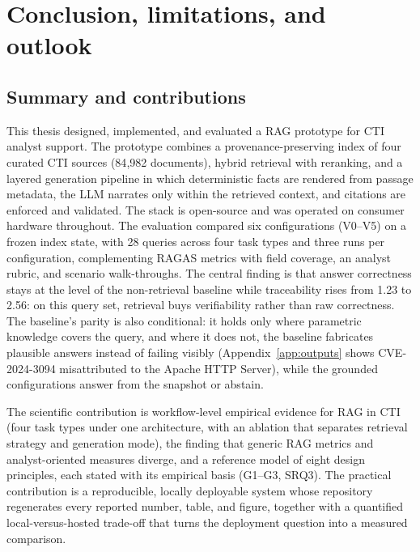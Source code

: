 \chapter{Conclusion, limitations, and outlook}
\label{ch:conclusion}

\section{Summary and contributions}
\label{sec:summary}

This thesis designed, implemented, and evaluated a RAG prototype for
CTI analyst support. The prototype combines a provenance-preserving
index of four curated CTI sources (84{,}982 documents), hybrid
retrieval with reranking, and a layered generation pipeline in which
deterministic facts are rendered from passage metadata, the LLM
narrates only within the retrieved context, and citations are enforced
and validated. The stack is open-source and was operated on consumer
hardware throughout. The evaluation compared six configurations
(V0--V5) on a frozen index state, with 28 queries across four task
types and three runs per configuration, complementing RAGAS metrics
with field coverage, an analyst rubric, and scenario walk-throughs.
The central finding is that answer correctness stays at the level of
the non-retrieval baseline while traceability rises from 1.23 to 2.56:
on this query set, retrieval buys verifiability rather than raw
correctness. The baseline's parity is also conditional: it holds only
where parametric knowledge covers the query, and where it does not,
the baseline fabricates plausible answers instead of failing visibly
(Appendix~\ref{app:outputs} shows CVE-2024-3094 misattributed to the
Apache HTTP Server), while the grounded configurations answer from the
snapshot or abstain.

The scientific contribution is workflow-level empirical evidence for
RAG in CTI (four task types under one architecture, with an ablation
that separates retrieval strategy and generation mode), the finding
that generic RAG metrics and analyst-oriented measures diverge, and a
reference model of eight design principles, each stated with its
empirical basis (G1--G3, SRQ3). The practical contribution is a
reproducible, locally deployable system whose repository regenerates
every reported number, table, and figure, together with a quantified
local-versus-hosted trade-off that turns the deployment question into
a measured comparison.


